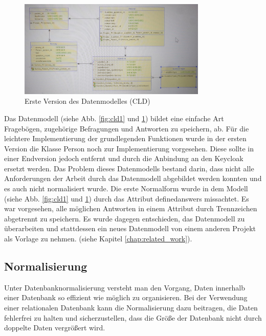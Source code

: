 \begin{figure}[H]
    \includegraphics[width=0.8\textwidth]{pics/Datamodel_Vesion1_relational.jpeg}
    \centering
    \caption{Erste Version des Datenmodelles (CLD)}
    \label{fig:cld2}
\end{figure}
Das Datenmodell (siehe Abb. \ref{fig:cld1} und \ref{fig:cld2}) bildet eine einfache Art Fragebögen, 
zugehörige Befragungen und Antworten zu speichern, ab.
Für die leichtere Implementierung der grundlegenden Funktionen wurde in der ersten Version die Klasse Person noch zur 
Implementierung vorgesehen. Diese sollte in einer Endversion jedoch entfernt und durch die Anbindung an den Keycloak ersetzt werden.
\newline
\newline
Das Problem dieses Datenmodells bestand darin, dass nicht alle Anforderungen 
der Arbeit durch das Datenmodell abgebildet werden konnten und es auch nicht normalisiert wurde. 
\newline
Die erste Normalform wurde in dem Modell (siehe Abb. \ref{fig:cld1} und \ref{fig:cld2}) durch das Attribut definedanswers 
missachtet. Es war vorgesehen, alle möglichen Antworten in einem Attribut durch Trennzeichen abgetrennt zu speichern.
\newline
Es wurde dagegen entschieden, das Datenmodell zu überarbeiten und stattdessen ein neues Datenmodell von einem anderen Projekt als Vorlage 
zu nehmen. (siehe Kapitel \ref{chap:related_work}). 

\subsection{Normalisierung}
Unter Datenbanknormalisierung versteht man den Vorgang, Daten innerhalb einer Datenbank so effizient wie möglich zu organisieren.
Bei der Verwendung einer relationalen Datenbank kann die Normalisierung dazu beitragen, 
die Daten fehlerfrei zu halten und sicherzustellen, dass die Größe der Datenbank nicht durch 
doppelte Daten vergrößert wird. \cite{noauthor_normalisierung_2022}

